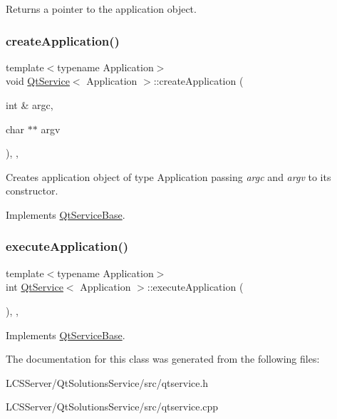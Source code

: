 Returns a pointer to the application object. \mbox{\label{class_qt_service_a50aa2079345abfd0b1284be47e245b0b}} 
\subsubsection{\texorpdfstring{create\+Application()}{createApplication()}}
{\footnotesize\ttfamily template$<$typename Application$>$ \\
void \hyperlink{class_qt_service}{Qt\+Service}$<$ Application $>$\+::create\+Application (\begin{DoxyParamCaption}\item[{int \&}]{argc,  }\item[{char $\ast$$\ast$}]{argv }\end{DoxyParamCaption})\hspace{0.3cm}{\ttfamily [inline]}, {\ttfamily [protected]}, {\ttfamily [virtual]}}

Creates application object of type Application passing {\itshape argc} and {\itshape argv} to its constructor.

Implements \hyperlink{class_qt_service_base_ac5ae73935f489282b35c70b27b341390}{Qt\+Service\+Base}.

\mbox{\label{class_qt_service_a84f5f60304117e1f11cc0ed16dc0b72e}} 
\subsubsection{\texorpdfstring{execute\+Application()}{executeApplication()}}
{\footnotesize\ttfamily template$<$typename Application$>$ \\
int \hyperlink{class_qt_service}{Qt\+Service}$<$ Application $>$\+::execute\+Application (\begin{DoxyParamCaption}{ }\end{DoxyParamCaption})\hspace{0.3cm}{\ttfamily [inline]}, {\ttfamily [protected]}, {\ttfamily [virtual]}}



Implements \hyperlink{class_qt_service_base_ab70633cd29a22758dfa0502b77e564f6}{Qt\+Service\+Base}.



The documentation for this class was generated from the following files\+:\begin{DoxyCompactItemize}
\item 
L\+C\+S\+Server/\+Qt\+Solutions\+Service/src/qtservice.\+h\item 
L\+C\+S\+Server/\+Qt\+Solutions\+Service/src/qtservice.\+cpp\end{DoxyCompactItemize}
